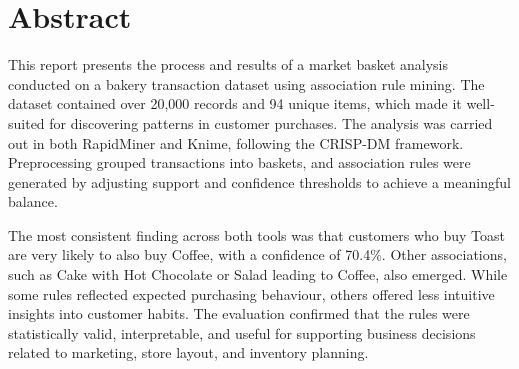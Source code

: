 \chapter*{Abstract}
\label{chap:abstract}
This report presents the process and results of a market basket analysis conducted on a bakery transaction dataset 
using association rule mining. The dataset contained over 20,000 records and 94 unique items, which made it 
well-suited for discovering patterns in customer purchases. The analysis was carried out in both RapidMiner and 
Knime, following the CRISP-DM framework. Preprocessing grouped transactions into baskets, and association rules 
were generated by adjusting support and confidence thresholds to achieve a meaningful balance.

The most consistent finding across both tools was that customers who buy Toast are very likely to also buy Coffee, 
with a confidence of 70.4\%. Other associations, such as Cake with Hot Chocolate or Salad leading to Coffee, also 
emerged. While some rules reflected expected purchasing behaviour, others offered less intuitive insights into 
customer habits. The evaluation confirmed that the rules were statistically valid, interpretable, and useful for 
supporting business decisions related to marketing, store layout, and inventory planning.

\thispagestyle{empty}
\addtocounter{page}{-1}